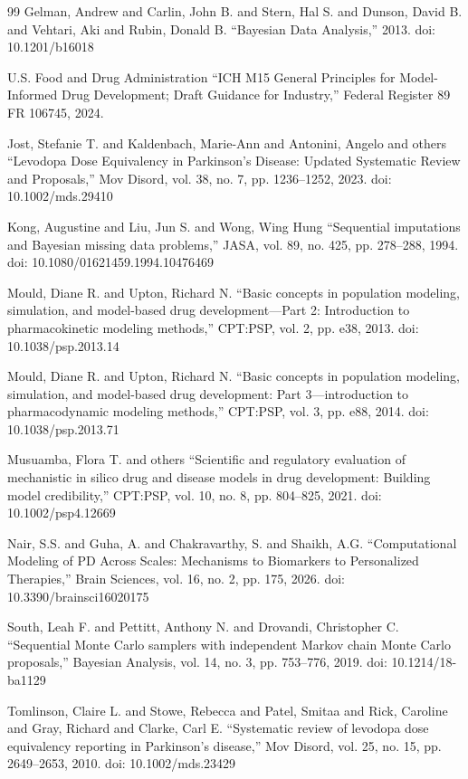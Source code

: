 \begin{thebibliography}{99}
 Gelman, Andrew and Carlin, John B. and Stern, Hal S. and Dunson, David B. and Vehtari, Aki and Rubin, Donald B. ``Bayesian Data Analysis,'' 2013. doi: 10.1201/b16018

 U.S. Food and Drug Administration ``ICH M15 General Principles for Model-Informed Drug Development; Draft Guidance for Industry,'' Federal Register 89 FR 106745, 2024.

 Jost, Stefanie T. and Kaldenbach, Marie-Ann and Antonini, Angelo and others ``Levodopa Dose Equivalency in Parkinson's Disease: Updated Systematic Review and Proposals,'' Mov Disord, vol. 38, no. 7, pp. 1236--1252, 2023. doi: 10.1002/mds.29410

 Kong, Augustine and Liu, Jun S. and Wong, Wing Hung ``Sequential imputations and Bayesian missing data problems,'' JASA, vol. 89, no. 425, pp. 278--288, 1994. doi: 10.1080/01621459.1994.10476469

 Mould, Diane R. and Upton, Richard N. ``Basic concepts in population modeling, simulation, and model-based drug development---Part 2: Introduction to pharmacokinetic modeling methods,'' CPT:PSP, vol. 2, pp. e38, 2013. doi: 10.1038/psp.2013.14

 Mould, Diane R. and Upton, Richard N. ``Basic concepts in population modeling, simulation, and model-based drug development: Part 3---introduction to pharmacodynamic modeling methods,'' CPT:PSP, vol. 3, pp. e88, 2014. doi: 10.1038/psp.2013.71

 Musuamba, Flora T. and others ``Scientific and regulatory evaluation of mechanistic in silico drug and disease models in drug development: Building model credibility,'' CPT:PSP, vol. 10, no. 8, pp. 804--825, 2021. doi: 10.1002/psp4.12669

 Nair, S.S. and Guha, A. and Chakravarthy, S. and Shaikh, A.G. ``Computational Modeling of PD Across Scales: Mechanisms to Biomarkers to Personalized Therapies,'' Brain Sciences, vol. 16, no. 2, pp. 175, 2026. doi: 10.3390/brainsci16020175

 South, Leah F. and Pettitt, Anthony N. and Drovandi, Christopher C. ``Sequential Monte Carlo samplers with independent Markov chain Monte Carlo proposals,'' Bayesian Analysis, vol. 14, no. 3, pp. 753--776, 2019. doi: 10.1214/18-ba1129

 Tomlinson, Claire L. and Stowe, Rebecca and Patel, Smitaa and Rick, Caroline and Gray, Richard and Clarke, Carl E. ``Systematic review of levodopa dose equivalency reporting in Parkinson's disease,'' Mov Disord, vol. 25, no. 15, pp. 2649--2653, 2010. doi: 10.1002/mds.23429


\end{thebibliography}

